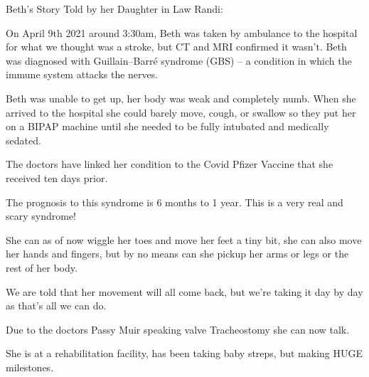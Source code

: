Beth’s Story Told by her Daughter in Law Randi:

On April 9th 2021 around 3:30am, Beth was taken by ambulance to the hospital for
what we thought was a stroke, but CT and MRI confirmed it wasn’t. Beth was
diagnosed with Guillain–Barré syndrome (GBS) – a condition in which the immune
system attacks the nerves.

Beth was unable to get up, her body was weak and completely numb. When she
arrived to the hospital she could barely move, cough, or swallow so they put her
on a BIPAP machine until she needed to be fully intubated and medically sedated.

The doctors have linked her condition to the Covid Pfizer Vaccine that she
received ten days prior.

The prognosis to this syndrome is 6 months to 1 year. This is a very real and
scary syndrome!

She can as of now wiggle her toes and move her feet a tiny bit, she can also
move her hands and fingers, but by no means can she pickup her arms or legs or
the rest of her body.

We are told that her movement will all come back, but we’re taking it day by day
as that’s all we can do.

Due to the doctors Passy Muir speaking valve Tracheostomy she can now talk.

She is at a rehabilitation facility, has been taking baby streps, but making
HUGE milestones.

